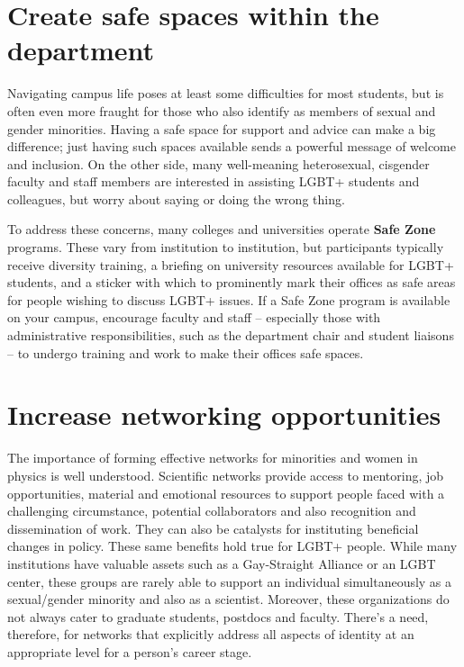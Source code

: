 \section {Create safe spaces within the department}
\label{safe-spaces}
Navigating campus life poses at least some difficulties for most students, but is often even more fraught for those who also identify as members of sexual and gender minorities. Having a safe space for support and advice can make a big difference; just having such spaces available sends a powerful message of welcome and inclusion. On the other side, many well-meaning heterosexual, cisgender faculty and staff members are interested in assisting LGBT+ students and colleagues, but worry about saying or doing the wrong thing.

To address these concerns, many colleges and universities operate \textbf{Safe Zone} programs. These vary from institution to institution, but participants typically receive diversity training, a briefing on university resources available for LGBT+ students, and a sticker with which to prominently mark their offices as safe areas for people wishing to discuss LGBT+ issues. If a Safe Zone program is available on your campus, encourage faculty and staff -- especially those with administrative responsibilities, such as the department chair and student liaisons -- to undergo training and work to make their offices safe spaces.


\section {Increase networking opportunities}
\label{networking}
The importance of forming effective networks for minorities and women in physics is well understood. Scientific networks provide access to mentoring, job opportunities, material and emotional resources to support people faced with a challenging circumstance, potential collaborators and also recognition and dissemination of work. They can also be catalysts for instituting beneficial changes in policy. These same benefits hold true for LGBT+ people. While many institutions have valuable assets such as a Gay-Straight Alliance or an LGBT center, these groups are rarely able to support an individual simultaneously as a sexual/gender minority and also as a scientist. Moreover, these organizations do not always cater to graduate students, postdocs and faculty. There's a need, therefore, for networks that explicitly address all aspects of identity at an appropriate level for a person's career stage.

